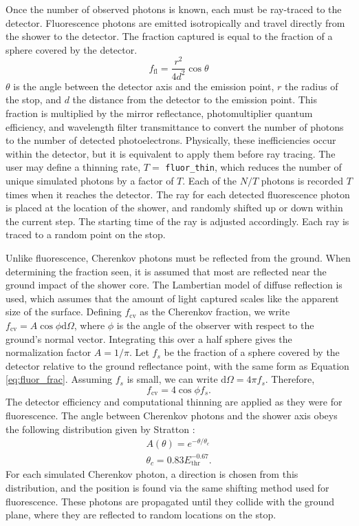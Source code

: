 Once the number of observed photons is known, each must be ray-traced to the detector. Fluorescence photons are emitted isotropically and travel directly from the shower to the detector. The fraction captured is equal to the fraction of a sphere covered by the detector.
\begin{equation} \label{eq:fluor_frac}
    f_\text{fl} = \frac{r^2}{4d^2} \cos{\theta}
\end{equation}
$\theta$ is the angle between the detector axis and the emission point, $r$ the radius of the stop, and $d$ the distance from the detector to the emission point. This fraction is multiplied by the mirror reflectance, photomultiplier quantum efficiency, and wavelength filter transmittance to convert the number of photons to the number of detected photoelectrons. Physically, these inefficiencies occur within the detector, but it is equivalent to apply them before ray tracing. The user may define a thinning rate, $T = $ \texttt{fluor\_thin}, which reduces the number of unique simulated photons by a factor of $T$. Each of the $N / T$ photons is recorded $T$ times when it reaches the detector. The ray for each detected fluorescence photon is placed at the location of the shower, and randomly shifted up or down within the current step. The starting time of the ray is adjusted accordingly. Each ray is traced to a random point on the stop.

Unlike fluorescence, Cherenkov photons must be reflected from the ground. When determining the fraction seen, it is assumed that most are reflected near the ground impact of the shower core. The Lambertian model of diffuse reflection is used, which assumes that the amount of light captured scales like the apparent size of the surface. Defining $f_\text{cv}$ as the Cherenkov fraction, we write $f_\text{cv} = A \cos{\phi} \text{d} \Omega$, where $\phi$ is the angle of the observer with respect to the ground's normal vector. Integrating this over a half sphere gives the normalization factor $A = 1 / \pi$. Let $f_s$ be the fraction of a sphere covered by the detector relative to the ground reflectance point, with the same form as Equation \ref{eq:fluor_frac}. Assuming $f_s$ is small, we can write $\text{d}\Omega = 4 \pi f_s$. Therefore,
\begin{equation}
    f_\text{cv} = 4 \cos{\phi} f_s.
\end{equation}
The detector efficiency and computational thinning are applied as they were for fluorescence. The angle between Cherenkov photons and the shower axis obeys the following distribution given by Stratton \cite{stratton2012ta}:
\begin{equation} \label{eq:ckv_angle}
\begin{gathered}
    A(\theta) = e^{-\theta / \theta_c} \\
    \theta_c = 0.83 E_\text{thr}^{-0.67}.
\end{gathered}
\end{equation}
For each simulated Cherenkov photon, a direction is chosen from this distribution, and the position is found via the same shifting method used for fluorescence. These photons are propagated until they collide with the ground plane, where they are reflected to random locations on the stop.

